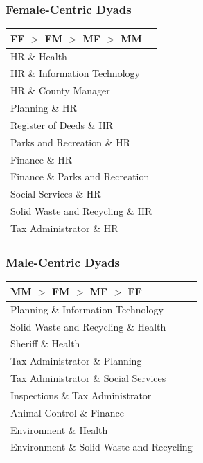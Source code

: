 \documentclass[xcolor={table}]{beamer}
\newcommand{\male}[1]{\colorbox{male}{#1}}
\newcommand{\female}[1]{\colorbox{female}{#1}}
\begin{document}
\begin{frame}\frametitle{Female-Centric Dyads}
	\centering
	\Large
	\begin{tabular}{l}
	  \toprule
	FF $>$ FM $>$ MF $>$ MM  \\
	\hline
	  \female{HR} \& Health  \\ 
	  \female{HR} \& \male{Information Technology}  \\ 
	  \female{HR} \& \male{County Manager}  \\ 
	  \male{Planning} \& \female{HR} \\ 
	  Register of Deeds \& \female{HR}  \\ 
	  Parks and Recreation \& \female{HR}  \\ 
	  \female{Finance} \& \female{HR}  \\ 
	  \female{Finance} \& Parks and Recreation  \\ 
	  Social Services \& \female{HR}  \\ 
	  \male{Solid Waste and Recycling} \& \female{HR}  \\ 
	  Tax Administrator \& \female{HR}  \\ 
	   \bottomrule
	\end{tabular}
	
	
	
	
\end{frame}


\begin{frame}\frametitle{Male-Centric Dyads}
	\centering
	\Large
	\begin{tabular}{l}
	  \toprule
	  MM $>$ FM $>$ MF $>$ FF \\ 
	  \midrule
	  \male{Planning} \& \male{Information Technology} \\ 
	  \male{Solid Waste and Recycling} \& Health \\ 
	  \male{Sheriff} \& Health  \\ 
	  Tax Administrator \& \male{Planning}  \\ 
	  Tax Administrator \& Social Services  \\ 
	  \male{Inspections} \& Tax Administrator  \\ 
	  \male{Animal Control} \& \female{Finance}   \\ 
	  \male{Environment} \& Health  \\ 
	  \male{Environment} \& \male{Solid Waste and Recycling}  \\  
	   \bottomrule
	\end{tabular}
	
	
	
	
\end{frame}
\end{document}
